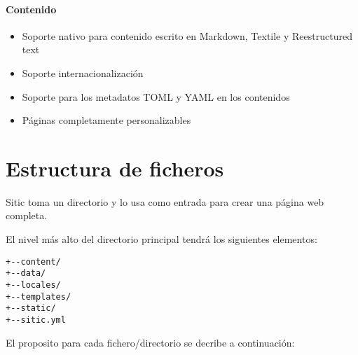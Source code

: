 \paragraph{Contenido}

\begin{itemize}
\item Soporte nativo para contenido escrito en Markdown, Textile y Reestructured text
\item Soporte internacionalización
\item Soporte para los metadatos TOML y YAML en los contenidos
\item Páginas completamente personalizables
\end{itemize}


\section{Estructura de ficheros}

Sitic toma un directorio y lo usa como entrada para crear una página web completa.

El nivel más alto del directorio principal tendrá los siguientes elementos:

\begin{verbatim}
+--content/
+--data/
+--locales/
+--templates/
+--static/
+--sitic.yml
\end{verbatim}

El proposito para cada fichero/directorio se decribe a continuación:

